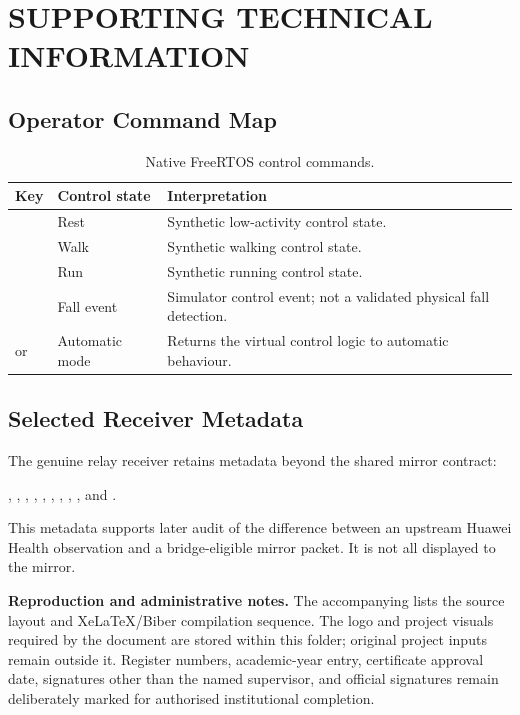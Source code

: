 \chapter{SUPPORTING TECHNICAL INFORMATION}

\section{Operator Command Map}
\begin{table}[H]
\centering
\caption{Native FreeRTOS control commands.}
\label{tab:command-map}
\begin{tabularx}{\textwidth}{p{25mm}Yp{42mm}}
\toprule
\textbf{Key} & \textbf{Control state} & \textbf{Interpretation}\\
\midrule
{} & Rest & Synthetic low-activity control state.\\
 & Walk & Synthetic walking control state.\\
 & Run & Synthetic running control state.\\
 & Fall event & Simulator control event; not a validated physical fall detection.\\
 or  & Automatic mode & Returns the virtual control logic to automatic behaviour.\\
\bottomrule
\end{tabularx}
\end{table}

\section{Selected Receiver Metadata}
\vspace{-5mm}
\singlespacing
{\raggedright
The genuine relay receiver retains metadata beyond the shared mirror contract:

, , , , , , , , , and .\par}

This metadata supports later audit of the difference between an upstream Huawei Health observation and a bridge-eligible mirror packet. It is not all displayed to the mirror.

\noindent\textbf{Reproduction and administrative notes.} The accompanying  lists the source layout and XeLaTeX/Biber compilation sequence. The logo and project visuals required by the document are stored within this folder; original project inputs remain outside it. Register numbers, academic-year entry, certificate approval date, signatures other than the named supervisor, and official signatures remain deliberately marked for authorised institutional completion.
\par
\onehalfspacing
